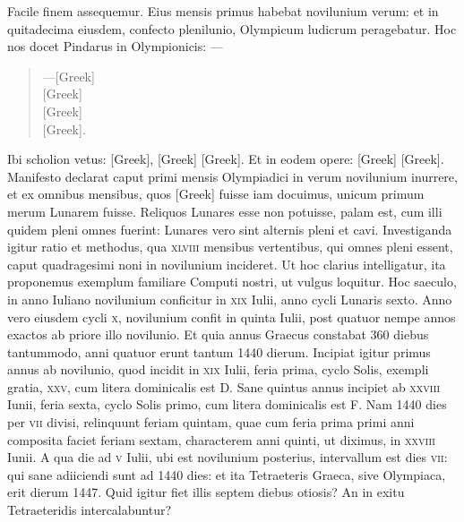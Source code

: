 Facile finem assequemur.
Eius mensis primus habebat novilunium verum:
et in quitadecima eiusdem, confecto plenilunio, Olympicum ludicrum
peragebatur.
Hoc nos docet Pindarus in Olympionicis: ---
\begin{quote}
---\textgreek{[Greek]}\\
\textgreek{[Greek]}\\
\textgreek{[Greek]}\\
\textgreek{[Greek]}.
\end{quote}
Ibi scholion vetus: \textgreek{[Greek]}, \textgreek{[Greek]}
\textgreek{[Greek]}.
Et in eodem opere: \textgreek{[Greek]}
\textgreek{[Greek]}.
Manifesto declarat caput primi mensis
Olympiadici in verum novilunium inurrere, et ex omnibus mensibus,
quos \textgreek{[Greek]} fuisse iam docuimus, unicum primum merum
Lunarem fuisse.
Reliquos Lunares esse non potuisse, palam est, cum illi
quidem pleni omnes fuerint: Lunares vero sint alternis pleni et cavi.
Investiganda
igitur ratio et methodus, qua \textsc{xlviii} mensibus vertentibus,
qui omnes pleni essent, caput quadragesimi noni in novilunium
incideret.
Ut hoc clarius intelligatur, ita proponemus exemplum familiare
Computi nostri, ut vulgus loquitur.
Hoc saeculo, in anno Iuliano
novilunium conficitur in \textsc{xix} Iulii, anno cycli Lunaris sexto.
Anno vero
eiusdem cycli \textsc{x}, novilunium confit in quinta Iulii, post quatuor
nempe annos exactos ab priore illo novilunio.
Et quia annus Graecus
constabat 360 diebus tantummodo, anni quatuor erunt tantum 1440
dierum.
Incipiat igitur primus annus ab novilunio, quod incidit in \textsc{xix}
Iulii, feria prima, cyclo Solis, exempli gratia,
 \textsc{xxv}, cum litera dominicalis
est D.
Sane quintus annus incipiet ab \textsc{xxviii} Iunii, feria sexta, cyclo Solis
primo, cum litera dominicalis est F.
Nam 1440 dies per \textsc{vii} divisi,
relinquunt feriam quintam, quae cum feria prima primi anni composita
faciet feriam sextam, characterem anni quinti, ut diximus, in
 \textsc{xxviii} Iunii.
A qua die ad \textsc{v} Iulii, ubi est novilunium posterius,
 intervallum est
dies \textsc{vii}: qui sane adiiciendi sunt ad 1440 dies: et ita
 Tetraeteris Graeca,
sive Olympiaca, erit dierum 1447.
Quid igitur fiet illis septem diebus
otiosis?
An in exitu Tetraeteridis intercalabuntur?

